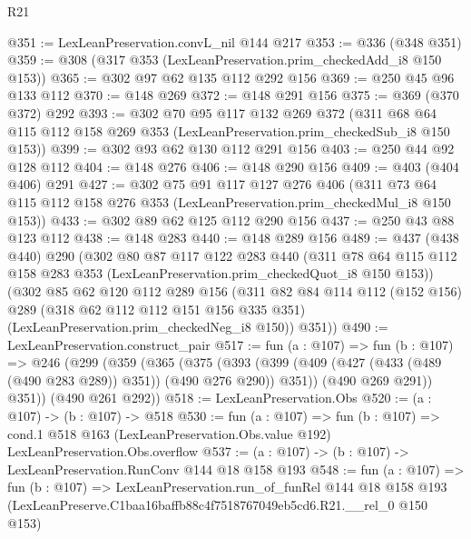\begin{lexlean}{R21}
\begin{coremodule}
@351 := LexLeanPreservation.convL_nil @144 @217
@353 := @336 (@348 @351)
@359 := @308 (@317 @353 (LexLeanPreservation.prim_checkedAdd_i8 @150 @153))
@365 := @302 @97 @62 @135 @112 @292 @156
@369 := @250 @45 @96 @133 @112
@370 := @148 @269
@372 := @148 @291 @156
@375 := @369 (@370 @372) @292
@393 := @302
    @70
    @95
    @117
    @132
    @269
    @372
    (@311 @68 @64 @115 @112 @158 @269 @353 (LexLeanPreservation.prim_checkedSub_i8 @150 @153))
@399 := @302 @93 @62 @130 @112 @291 @156
@403 := @250 @44 @92 @128 @112
@404 := @148 @276
@406 := @148 @290 @156
@409 := @403 (@404 @406) @291
@427 := @302
    @75
    @91
    @117
    @127
    @276
    @406
    (@311 @73 @64 @115 @112 @158 @276 @353 (LexLeanPreservation.prim_checkedMul_i8 @150 @153))
@433 := @302 @89 @62 @125 @112 @290 @156
@437 := @250 @43 @88 @123 @112
@438 := @148 @283
@440 := @148 @289 @156
@489 := @437
    (@438 @440)
    @290
    (@302
      @80
      @87
      @117
      @122
      @283
      @440
      (@311 @78 @64 @115 @112 @158 @283 @353 (LexLeanPreservation.prim_checkedQuot_i8 @150 @153))
      (@302
        @85
        @62
        @120
        @112
        @289
        @156
        (@311
          @82
          @84
          @114
          @112
          (@152 @156)
          @289
          (@318 @62 @112 @112 @151 @156 @335 @351)
          (LexLeanPreservation.prim_checkedNeg_i8 @150))
        @351))
@490 := LexLeanPreservation.construct_pair
@517 := fun (a : @107) =>
  fun (b : @107) =>
  @246
    (@299
      (@359
        (@365
          (@375
            (@393 (@399 (@409 (@427 (@433 (@489 (@490 @283 @289)) @351)) (@490 @276 @290)) @351))
            (@490 @269 @291))
          @351))
      (@490 @261 @292))
@518 := LexLeanPreservation.Obs
@520 := (a : @107) -> (b : @107) -> @518
@530 := fun (a : @107) =>
  fun (b : @107) =>
  cond.{1} @518 @163 (LexLeanPreservation.Obs.value @192) LexLeanPreservation.Obs.overflow
@537 := (a : @107) -> (b : @107) -> LexLeanPreservation.RunConv @144 @18 @158 @193
@548 := fun (a : @107) =>
  fun (b : @107) =>
  LexLeanPreservation.run_of_funRel
    @144
    @18
    @158
    @193
    (LexLeanPreserve.C1baa16baffb88c4f7518767049eb5cd6.R21.__rel_0 @150 @153)
\end{coremodule}
\end{lexlean}
